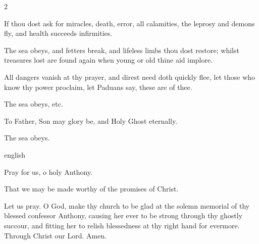 \begin{multicols}{2}
\raggedcolumns
\begin{enpars}
If thou dost ask for miracles,
death, error, all calamities,
the leprosy and demons fly,
and health succeeds infirmities.

\rr The sea obeys, and fetters break, and lifeless limbs thou dost restore; whilst treasures lost are found again when young or old thine aid implore.

All dangers vanish at thy prayer,
and direst need doth quickly flee,
let those who know thy power proclaim, 
let Paduans say, these are of thee.

\rr The sea obeys, etc.

To Father, Son may glory be,
and Holy Ghost eternally.

\rr The sea obeys.
\end{enpars}\end{multicols}

{english}{\noindent \vv Pray for us, o holy Anthony.

\noindent \rr That we may be made worthy of the promises of Christ.

\noindent Let us pray. O God, make thy church to be glad at the solemn memorial of thy blessed confessor Anthony, causing her ever to be strong through thy ghostly succour, and fitting her to relish blessedness at thy right hand for evermore. Through Christ our Lord. Amen.}